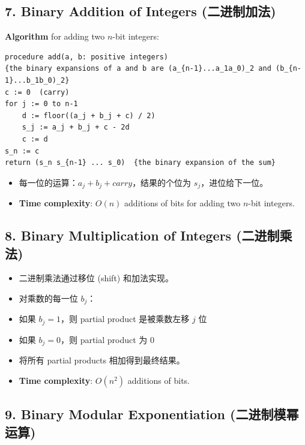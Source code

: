 \documentclass[10pt,a4paper,openany]{ctexbook}
\theoremstyle{definition}
\theoremstyle{remark}
\begin{document}
\vspace{-2pt}

\subsection{7. Binary Addition of Integers (二进制加法)}

\textbf{Algorithm} for adding two $n$-bit integers:
{\footnotesize\begin{verbatim}
procedure add(a, b: positive integers)
{the binary expansions of a and b are (a_{n-1}...a_1a_0)_2 and (b_{n-1}...b_1b_0)_2}
c := 0  (carry)
for j := 0 to n-1
    d := floor((a_j + b_j + c) / 2)
    s_j := a_j + b_j + c - 2d
    c := d
s_n := c
return (s_n s_{n-1} ... s_0)  {the binary expansion of the sum}
\end{verbatim}}

\begin{itemize}
\item 每一位的运算：$a_j + b_j + carry$，结果的个位为 $s_j$，进位给下一位。
\item \textbf{Time complexity}: $O(n)$ additions of bits for adding two $n$-bit integers.

\end{itemize}

\vspace{-2pt}

\subsection{8. Binary Multiplication of Integers (二进制乘法)}

\begin{itemize}
\item 二进制乘法通过移位 (shift) 和加法实现。
\item 对乘数的每一位 $b_j$：
\item 如果 $b_j = 1$，则 partial product 是被乘数左移 $j$ 位
\item 如果 $b_j = 0$，则 partial product 为 0
\item 将所有 partial products 相加得到最终结果。
\item \textbf{Time complexity}: $O(n^2)$ additions of bits.

\end{itemize}

\vspace{-2pt}

\subsection{9. Binary Modular Exponentiation (二进制模幂运算)}
\end{document}
